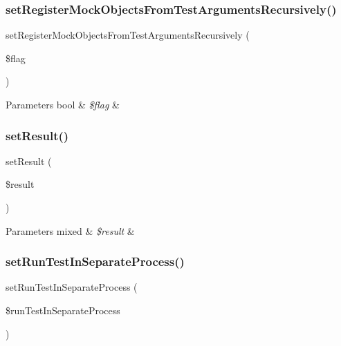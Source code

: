 \subsubsection{\texorpdfstring{set\+Register\+Mock\+Objects\+From\+Test\+Arguments\+Recursively()}{setRegisterMockObjectsFromTestArgumentsRecursively()}}
{\footnotesize\ttfamily set\+Register\+Mock\+Objects\+From\+Test\+Arguments\+Recursively (\begin{DoxyParamCaption}\item[{}]{\$flag }\end{DoxyParamCaption})}


\begin{DoxyParams}[1]{Parameters}
bool & {\em \$flag} & \\
\hline
\end{DoxyParams}
\mbox{\label{class_p_h_p_unit___framework___test_case_a02644cacaff67ad8a6b92bbe6127321f}} 
\subsubsection{\texorpdfstring{set\+Result()}{setResult()}}
{\footnotesize\ttfamily set\+Result (\begin{DoxyParamCaption}\item[{}]{\$result }\end{DoxyParamCaption})}


\begin{DoxyParams}[1]{Parameters}
mixed & {\em \$result} & \\
\hline
\end{DoxyParams}
\mbox{\label{class_p_h_p_unit___framework___test_case_a0cef8c0001d1beb9c775897699ea4f54}} 
\subsubsection{\texorpdfstring{set\+Run\+Test\+In\+Separate\+Process()}{setRunTestInSeparateProcess()}}
{\footnotesize\ttfamily set\+Run\+Test\+In\+Separate\+Process (\begin{DoxyParamCaption}\item[{}]{\$run\+Test\+In\+Separate\+Process }\end{DoxyParamCaption})}


